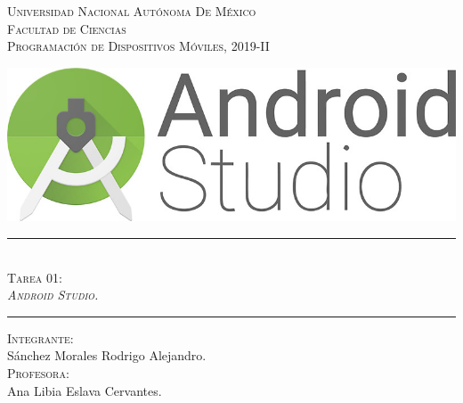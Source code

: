 \documentclass[answers]{exam}
\begin{document}
\begin{titlepage}
\begin{center}

{\huge \scshape Universidad Nacional Autónoma De México\\
Facultad de Ciencias\\\vspace{5mm} %
Programación de Dispositivos Móviles, 2019-II}\\[1cm]

\centering

\begin{center}
    \includegraphics[width=17.5cm]{img/Android_Studio.jpg}\\[1cm]
\end{center}
\rule{0.8\textwidth}{.8pt}\\
{\huge \Huge \scshape Tarea 01: \\
\vspace{5mm}
\textit{Android Studio.}}\\
\rule{0.8\textwidth}{.8pt}

\vspace{15mm} %

{\huge \scshape Integrante:}\\
\vspace{5mm} %
{\huge Sánchez Morales Rodrigo Alejandro.}\\ [1cm]

{\huge \scshape Profesora:}\\
\vspace{5mm} %
{\huge Ana Libia Eslava Cervantes.}\\ [1cm]


\end{center}
\end{titlepage}
\end{document}

